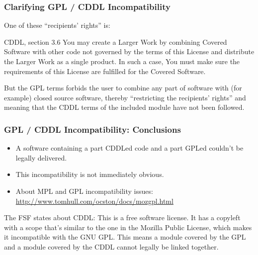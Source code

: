 
\begin{frame}
\frametitle{Clarifying GPL / CDDL Incompatibility}

One of these ``recipients' rights'' is:
\begin{block}{CDDL, section 3.6}
\footnotesize
You may create a Larger Work by combining Covered Software with other code not governed by the terms of this License and distribute the Larger Work as a single product. In such a case, You must make sure the requirements of this License are fulfilled for the Covered Software.
\end{block}

But the GPL terms forbids the user to combine any part of software with (for example) closed source software, thereby ``restricting the recipients' rights'' and meaning that the CDDL terms of the included module have not been followed.

\end{frame}


\begin{frame}
\frametitle{GPL / CDDL Incompatibility: Conclusions}

\begin{itemize}
\item A software containing a part CDDLed code and a part GPLed couldn't be legally delivered.
\item This incompatibility is not immediately obvious.
\item About MPL and GPL incompatibility issues: \url{http://www.tomhull.com/ocston/docs/mozgpl.html}
\end{itemize}

\begin{block}{The FSF states about CDDL:}
This is a free software license. It has a copyleft with a scope that's similar to the one in the Mozilla Public License, which makes it incompatible with the GNU GPL. This means a module covered by the GPL and a module covered by the CDDL cannot legally be linked together.
\end{block}

\end{frame}





